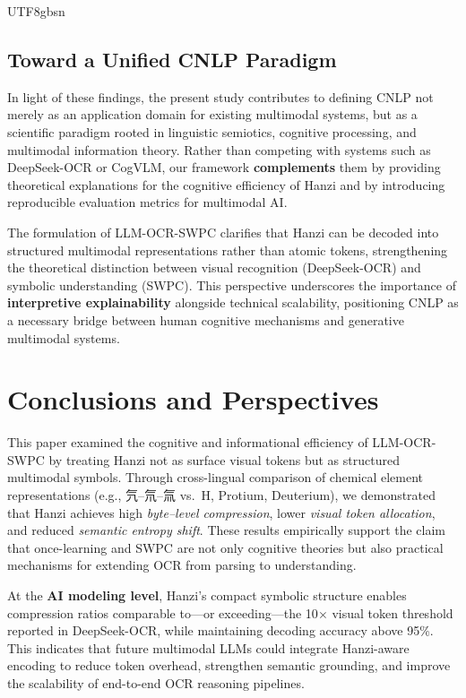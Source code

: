 \documentclass[conference]{IEEEtran}
\begin{document}
\begin{CJK*}{UTF8}{gbsn}
\subsection{Toward a Unified CNLP Paradigm}

In light of these findings, the present study contributes to defining CNLP not merely as an application domain for existing multimodal systems, but as a scientific paradigm rooted in linguistic semiotics, cognitive processing, and multimodal information theory. Rather than competing with systems such as DeepSeek-OCR or CogVLM, our framework \textbf{complements} them by providing theoretical explanations for the cognitive efficiency of Hanzi and by introducing reproducible evaluation metrics for multimodal AI.

The formulation of LLM-OCR-SWPC clarifies that Hanzi can be decoded into structured multimodal representations rather than atomic tokens, strengthening the theoretical distinction between visual recognition (DeepSeek-OCR) and symbolic understanding (SWPC). This perspective underscores the importance of \textbf{interpretive explainability} alongside technical scalability, positioning CNLP as a necessary bridge between human cognitive mechanisms and generative multimodal systems.

\section{Conclusions and Perspectives}
\label{sec:conclusion}

This paper examined the cognitive and informational efficiency of LLM-OCR-SWPC by treating Hanzi not as surface visual tokens but as structured multimodal symbols. Through cross-lingual comparison of chemical element representations (e.g., 氕–氘–氚 vs.\ H, Protium, Deuterium), we demonstrated that Hanzi achieves high \textit{byte–level compression}, lower \textit{visual token allocation}, and reduced \textit{semantic entropy shift}. These results empirically support the claim that once-learning and SWPC are not only cognitive theories but also practical mechanisms for extending OCR from parsing to understanding.

At the \textbf{AI modeling level}, Hanzi’s compact symbolic structure enables compression ratios comparable to—or exceeding—the 10$\times$ visual token threshold reported in DeepSeek-OCR, while maintaining decoding accuracy above 95\%. This indicates that future multimodal LLMs could integrate Hanzi-aware encoding to reduce token overhead, strengthen semantic grounding, and improve the scalability of end-to-end OCR reasoning pipelines.


\end{CJK*}
\end{document}
